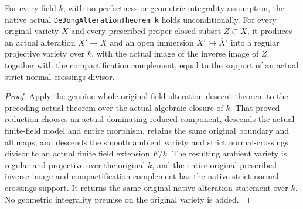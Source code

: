 \begin{theorem}
\label{thm:sm-bridge-alteration-arbitrary-unconditional}
\leanok
For every field $k$, with no perfectness or geometric integrality
assumption, the native actual \texttt{DeJongAlterationTheorem k}
holds unconditionally. For every original variety $X$ and every
prescribed proper closed subset $Z\subset X$, it produces an actual
alteration $X'\to X$ and an open immersion $X'\hookrightarrow\overline X'$
into a regular projective variety over $k$, with the actual image
of the inverse image of $Z$, together with the compactification
complement, equal to the support of an actual strict normal-crossings
divisor.
\end{theorem}
\begin{proof}
Apply the genuine whole original-field alteration descent theorem
to the preceding actual theorem over the actual algebraic closure
of $k$. That proved reduction chooses an actual dominating reduced
component, descends the actual finite-field model and entire
morphism, retains the same original boundary and all maps, and
descends the smooth ambient variety and strict normal-crossings
divisor to an actual finite field extension $E/k$. The resulting
ambient variety is regular and projective over the original $k$,
and the entire original prescribed inverse-image and compactification
complement has the native strict normal-crossings support.
It returns the same original native alteration statement over $k$.
No geometric integrality premise on the original variety is added.
\end{proof}

\endgroup

\begingroup

